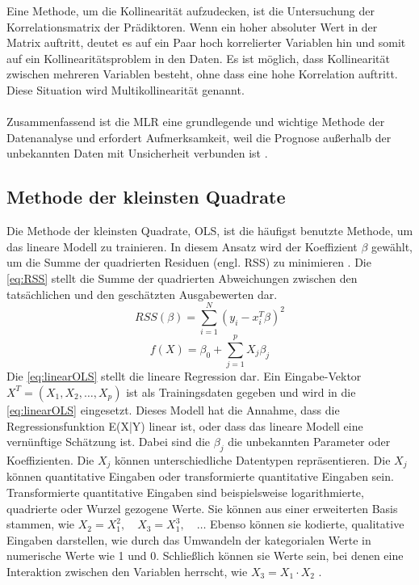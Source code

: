 Eine Methode, um die Kollinearität aufzudecken, ist die Untersuchung der Korrelationsmatrix der Prädiktoren. Wenn ein hoher absoluter Wert in der Matrix auftritt, deutet es auf ein Paar hoch korrelierter Variablen hin und somit auf ein Kollinearitätsproblem in den Daten. Es ist möglich, dass Kollinearität zwischen mehreren Variablen besteht, ohne dass eine hohe Korrelation auftritt. Diese Situation wird Multikollinearität genannt.\\\\
Zusammenfassend ist die \ac{MLR} eine grundlegende und wichtige Methode der Datenanalyse und erfordert Aufmerksamkeit, weil die Prognose außerhalb der unbekannten Daten mit Unsicherheit verbunden ist \cite{akinkunmi2018data}. 

\subsection{Methode der kleinsten Quadrate}
\label{methodederkleinstenquadrate}
Die Methode der kleinsten Quadrate, \ac{OLS}, ist die häufigst benutzte Methode, um das lineare Modell zu trainieren. In diesem Ansatz wird der Koeffizient $\beta$ gewählt, um die Summe der quadrierten Residuen (engl. \ac{RSS}) zu minimieren \cite{hastie2009elements}. Die \autoref{eq:RSS} stellt die Summe der quadrierten Abweichungen zwischen den tatsächlichen und den geschätzten Ausgabewerten dar. 
\begin{equation}
RSS(\beta) = \sum_{i=1}^{N} (y_i - x_i^T \beta)^2 
\label{eq:RSS}
\end{equation}
\begin{equation}
f(X) = \beta_0 + \sum_{j=1}^{p} X_j \beta_j 
\label{eq:linearOLS}
\end{equation}
Die \autoref{eq:linearOLS} stellt die lineare Regression dar. Ein Eingabe-Vektor \( X^T = (X_1, X_2, \ldots, X_p) \) ist als Trainingsdaten gegeben und wird in die \autoref{eq:linearOLS} eingesetzt. Dieses Modell hat die Annahme, dass die Regressionsfunktion E(X|Y) linear ist, oder dass das lineare Modell eine vernünftige Schätzung ist. Dabei sind die $\beta_j$ die unbekannten Parameter oder Koeffizienten. Die \( X_j \) können unterschiedliche Datentypen repräsentieren. Die \( X_j \) können quantitative Eingaben oder transformierte quantitative Eingaben sein. Transformierte quantitative Eingaben sind beispielsweise logarithmierte, quadrierte oder Wurzel gezogene Werte. Sie können aus einer erweiterten Basis stammen, wie \( X_2 = X_1^2, \quad X_3 = X_1^3,\quad \ldots \) Ebenso können sie kodierte, qualitative Eingaben darstellen, wie durch das Umwandeln der kategorialen Werte in numerische Werte wie 1 und 0. Schließlich können sie Werte sein, bei denen eine Interaktion zwischen den Variablen herrscht, wie \( X_3 = X_1 \cdot X_2 \) \cite{hastie2009elements}.\\\\

